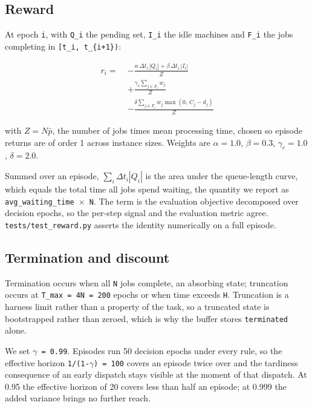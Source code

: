 \subsection{Reward}\label{reward}

At epoch \texttt{i}, with \texttt{Q\_i} the pending set, \texttt{I\_i} the idle machines and \texttt{F\_i} the jobs completing in
\texttt{{[}t\_i,\ t\_\{i+1\})}:

\[
\begin{aligned}
r_i = \;& -\frac{\alpha\,\Delta t_i\,|Q_i| + \beta\,\Delta t_i\,|I_i|}{Z} \\
        & + \frac{\gamma_c \sum_{j \in F_i} w_j}{Z} \\
        & - \frac{\delta \sum_{j \in F_i} w_j \max(0,\, C_j - d_j)}{Z}
\end{aligned}
\]

with \(Z = N\bar{p}\), the number of jobs times mean processing time, chosen so episode returns are of
order 1 across instance sizes. Weights are \(\alpha = 1.0\), \(\beta = 0.3\), \(\gamma_c = 1.0\), \(\delta = 2.0\).

Summed over an episode, \(\sum_i \Delta t_i |Q_i|\) is the area
under the queue-length curve, which equals the total time all jobs spend waiting, the quantity we
report as \texttt{avg\_waiting\_time\ $\times$\ N}. The term is the evaluation objective decomposed over decision
epochs, so the per-step signal and the evaluation metric agree.
\texttt{tests/test\_reward.py} asserts the identity numerically on a full episode.

\subsection{Termination and discount}\label{termination-truncation-and-discount}

Termination occurs when all \texttt{N} jobs complete, an absorbing state; truncation occurs at
\texttt{T\_max\ =\ 4N\ =\ 200} epochs or when time exceeds \texttt{H}. Truncation is a harness limit rather than a
property of the task, so a truncated state is bootstrapped rather than zeroed, which is why the
buffer stores \texttt{terminated} alone.

We set \texttt{$\gamma$\ =\ 0.99}. Episodes run 50 decision epochs under every rule, so the effective horizon
\texttt{1/(1-$\gamma$)\ =\ 100} covers an episode twice over and the tardiness consequence of an early dispatch
stays visible at the moment of that dispatch. At 0.95 the effective horizon of 20 covers less than half an episode; at 0.999 the added
variance brings no further reach.

